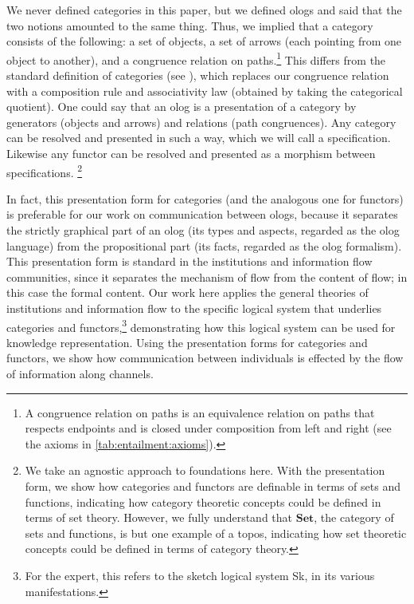 \documentclass{amsart}
\theoremstyle{remark}
\theoremstyle{definition}
\begin{document}
We never defined categories in this paper, but we defined ologs and said that the two notions amounted to the same thing. Thus, we implied that a category consists of the following: a set of objects, a set of arrows (each pointing from one object to another), and a congruence relation on paths.\footnote{A congruence relation on paths is an equivalence relation on paths
that respects endpoints and is closed under composition from left and right 
(see the axioms in \ref{tab:entailment:axioms}).}
%
This differs from the standard definition of categories (see \cite{Mac}), which replaces
our congruence relation with a composition rule and associativity law (obtained by taking the categorical quotient). One could say that an olog is a presentation of a category by generators (objects and arrows) and relations (path congruences). Any category can be resolved and presented in such a way, which we will call a specification. Likewise any functor can be resolved and presented as a morphism between specifications.
\footnote{We take an agnostic approach to foundations here. 
With the presentation form, we show how categories and functors are definable in terms of sets and functions,
indicating how category theoretic concepts could be defined in terms of set theory. 
However, we fully understand that $\mathbf{Set}$, the category of sets and functions, is but one example of a topos, 
indicating how set theoretic concepts could be defined in terms of category theory.}

In fact, this presentation form for categories (and the analogous one for functors) 
is preferable for our work on communication between ologs, 
because it separates the strictly graphical part of an olog (its types and aspects, regarded as the olog language) 
from the propositional part (its facts, regarded as the olog formalism). 
This presentation form is standard in the institutions \cite{GB:INS} and information flow \cite{BS:IF} communities, 
since it separates the mechanism of flow from the content of flow; in this case the formal content. 
%
Our work here applies the general theories of institutions and information flow to the specific logical system that underlies categories and functors,\footnote{For the expert, this refers to the sketch logical system {\ttfamily Sk}, 
in its various manifestations.}
demonstrating how this logical system can be used for knowledge representation.
Using the presentation forms for categories and functors, we show how communication  between individuals is effected by the flow of information along channels. 
\end{document}
